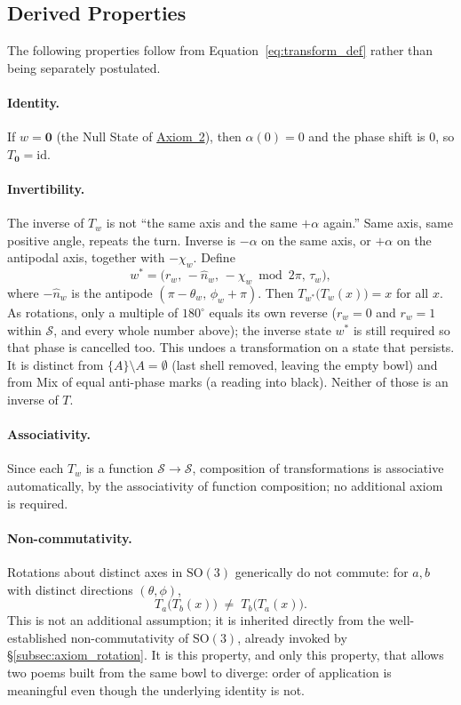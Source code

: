 \documentclass[12pt, a4paper]{article}
\begin{document}
\subsection{Derived Properties}
\label{subsec:transform_properties}
The following properties follow from Equation~\eqref{eq:transform_def}
rather than being separately postulated.

\paragraph{Identity.} If $w = \mathbf{0}$ (the Null State of
\hyperref[subsec:axiom_null]{Axiom~2}), then $\alpha(0) = 0$ and the phase
shift is $0$, so $T_{\mathbf{0}} = \mathrm{id}$.

\paragraph{Invertibility.}
The inverse of $T_w$ is not ``the same axis and the same $+\alpha$ again.'' Same axis, same positive angle, repeats the turn. Inverse is $-\alpha$ on the same axis, or $+\alpha$ on the antipodal axis, together with $-\chi_w$. Define
\begin{equation}
    w^{*} = \bigl(r_w,\,-\hat n_w,\,-\chi_w \bmod 2\pi,\,\tau_w\bigr),
\end{equation}
where $-\hat n_w$ is the antipode $(\pi-\theta_w,\,\phi_w+\pi)$.
Then $T_{w^{*}}\!\big(T_w(x)\big) = x$ for all $x$. As rotations, only a multiple of $180^\circ$ equals its own reverse ($r_w=0$ and $r_w=1$ within $\mathcal{S}$, and every whole number above); the inverse state $w^{*}$ is still required so that phase is cancelled too. This undoes a transformation on a state that persists. It is distinct from $\{A\}\setminus A=\emptyset$ (last shell removed, leaving the empty bowl) and from Mix of equal anti-phase marks (a reading into black). Neither of those is an inverse of $T$.

\paragraph{Associativity.} Since each $T_w$ is a function
$\mathcal{S} \to \mathcal{S}$, composition of transformations is
associative automatically, by the associativity of function
composition; no additional axiom is required.

\paragraph{Non-commutativity.} Rotations about distinct axes in
$\mathrm{SO}(3)$ generically do not commute: for $a, b$ with distinct
directions $(\theta,\phi)$,
\begin{equation}
    T_a\big(T_b(x)\big) \;\neq\; T_b\big(T_a(x)\big).
    \label{eq:noncommute}
\end{equation}
This is not an additional assumption; it is inherited directly from
the well-established non-commutativity of $\mathrm{SO}(3)$, already
invoked by \S\ref{subsec:axiom_rotation}. It is this property,
and only this property, that allows two poems built from the same
bowl to diverge: order of application is meaningful even
though the underlying identity is not.
\end{document}
